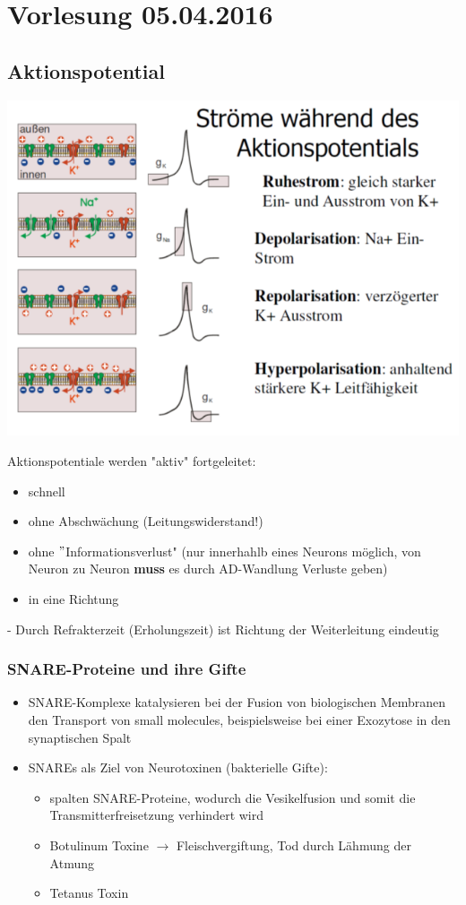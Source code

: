 \section{Vorlesung 05.04.2016}
\subsection{Aktionspotential}
\includegraphics[width=1\textwidth]{lectures/160405/pix/aktionspotential.png}

Aktionspotentiale werden "aktiv" fortgeleitet:
\begin{itemize}
	\item schnell
	\item ohne Abschwächung (Leitungswiderstand!)
	\item ohne $"$Informationsverlust" (nur innerhahlb eines Neurons möglich, von Neuron zu Neuron \textbf{muss} es durch AD-Wandlung Verluste geben)
	\item in eine Richtung
\end{itemize}

 - Durch Refrakterzeit (Erholungszeit) ist Richtung der Weiterleitung eindeutig

\subsubsection{SNARE-Proteine und ihre Gifte}
\begin{itemize}
	\item SNARE-Komplexe katalysieren bei der Fusion von biologischen Membranen den Transport von small molecules, beispielsweise bei einer Exozytose in den synaptischen Spalt
	\item SNAREs als Ziel von Neurotoxinen (bakterielle Gifte):
		\begin{itemize}
			\item spalten SNARE-Proteine, wodurch die Vesikelfusion und somit die Transmitterfreisetzung verhindert wird
			\item Botulinum Toxine $\rightarrow$ Fleischvergiftung, Tod durch Lähmung der Atmung
			\item Tetanus Toxin
		\end{itemize}
\end{itemize}

